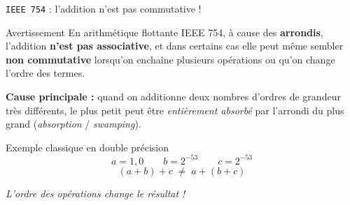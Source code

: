 \begin{frame}{\texttt{IEEE 754} : l'addition n'est pas commutative !}
  \begin{alertblock}{Avertissement}
    En arithmétique flottante IEEE 754, à cause des \textbf{arrondis},
    l'addition \textbf{n'est pas associative}, et dans certains cas elle
    peut même sembler \textbf{non commutative} lorsqu'on enchaîne
    plusieurs opérations ou qu'on change l'ordre des termes.
  \end{alertblock}

  \vspace{0.4cm}
  \textbf{Cause principale :} quand on additionne deux nombres d'ordres
  de grandeur très différents, le plus petit peut être \emph{entièrement
  absorbé} par l'arrondi du plus grand (\emph{absorption} / \emph{swamping}).

  \vspace{0.4cm}
  \begin{block}{Exemple classique en double précision}
    \[
      a = 1{,}0 \qquad b = 2^{-53} \qquad c = 2^{-53}
    \]
    \[
      (a + b) + c \;\neq\; a + (b + c)
    \]
  \end{block}

  \vspace{0.3cm}
  \centering
  \textit{L'ordre des opérations change le résultat !}
\end{frame}
